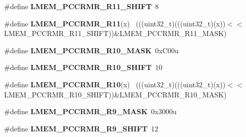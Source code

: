 \begin{DoxyCompactItemize}
\item 
\hypertarget{group___l_m_e_m___register___masks_ga1350c0ab268866002f48d5920a168a18}{}\#define {\bfseries L\+M\+E\+M\+\_\+\+P\+C\+C\+R\+M\+R\+\_\+\+R11\+\_\+\+S\+H\+I\+F\+T}~8\label{group___l_m_e_m___register___masks_ga1350c0ab268866002f48d5920a168a18}

\item 
\hypertarget{group___l_m_e_m___register___masks_ga8e3e09273259926601e36e8b539d4c9e}{}\#define {\bfseries L\+M\+E\+M\+\_\+\+P\+C\+C\+R\+M\+R\+\_\+\+R11}(x)                                          ~(((uint32\+\_\+t)(((uint32\+\_\+t)(x))$<$$<$L\+M\+E\+M\+\_\+\+P\+C\+C\+R\+M\+R\+\_\+\+R11\+\_\+\+S\+H\+I\+F\+T))\&L\+M\+E\+M\+\_\+\+P\+C\+C\+R\+M\+R\+\_\+\+R11\+\_\+\+M\+A\+S\+K)\label{group___l_m_e_m___register___masks_ga8e3e09273259926601e36e8b539d4c9e}

\item 
\hypertarget{group___l_m_e_m___register___masks_ga6338eea2b5bb3af71f3cff45bac00ce8}{}\#define {\bfseries L\+M\+E\+M\+\_\+\+P\+C\+C\+R\+M\+R\+\_\+\+R10\+\_\+\+M\+A\+S\+K}~0x\+C00u\label{group___l_m_e_m___register___masks_ga6338eea2b5bb3af71f3cff45bac00ce8}

\item 
\hypertarget{group___l_m_e_m___register___masks_ga6f931ed35be05a2db204b443714f9ce8}{}\#define {\bfseries L\+M\+E\+M\+\_\+\+P\+C\+C\+R\+M\+R\+\_\+\+R10\+\_\+\+S\+H\+I\+F\+T}~10\label{group___l_m_e_m___register___masks_ga6f931ed35be05a2db204b443714f9ce8}

\item 
\hypertarget{group___l_m_e_m___register___masks_gad6c9ee3d424c67836a9dfef699f955ec}{}\#define {\bfseries L\+M\+E\+M\+\_\+\+P\+C\+C\+R\+M\+R\+\_\+\+R10}(x)                                          ~(((uint32\+\_\+t)(((uint32\+\_\+t)(x))$<$$<$L\+M\+E\+M\+\_\+\+P\+C\+C\+R\+M\+R\+\_\+\+R10\+\_\+\+S\+H\+I\+F\+T))\&L\+M\+E\+M\+\_\+\+P\+C\+C\+R\+M\+R\+\_\+\+R10\+\_\+\+M\+A\+S\+K)\label{group___l_m_e_m___register___masks_gad6c9ee3d424c67836a9dfef699f955ec}

\item 
\hypertarget{group___l_m_e_m___register___masks_ga80abdce5a1e778207bfff5f050eee0fa}{}\#define {\bfseries L\+M\+E\+M\+\_\+\+P\+C\+C\+R\+M\+R\+\_\+\+R9\+\_\+\+M\+A\+S\+K}~0x3000u\label{group___l_m_e_m___register___masks_ga80abdce5a1e778207bfff5f050eee0fa}

\item 
\hypertarget{group___l_m_e_m___register___masks_ga570cd7caa1e57144e7ab123744267712}{}\#define {\bfseries L\+M\+E\+M\+\_\+\+P\+C\+C\+R\+M\+R\+\_\+\+R9\+\_\+\+S\+H\+I\+F\+T}~12\label{group___l_m_e_m___register___masks_ga570cd7caa1e57144e7ab123744267712}


\end{DoxyCompactItemize}
